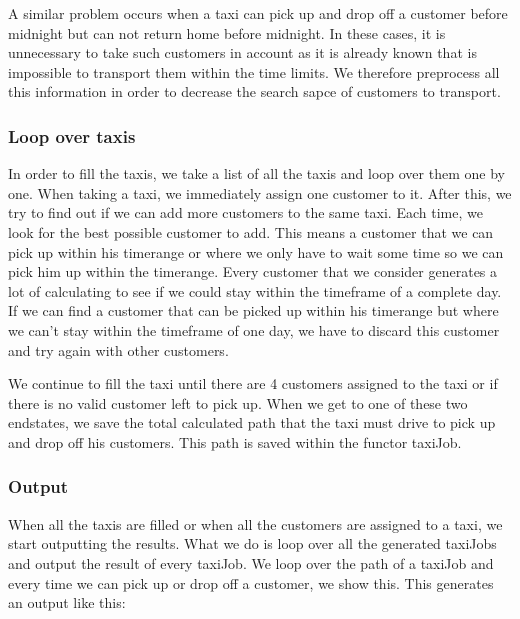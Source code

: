\documentclass[10pt,a4paper]{article}
\begin{document}
A similar problem occurs when a taxi can pick up and drop off a customer before midnight but can not return home before midnight. In these cases, it is unnecessary to take such customers in account as it is already known that is impossible to transport them within the time limits. We therefore preprocess all this information in order to decrease the search sapce of customers to transport.

\subsubsection{Loop over taxis}

In order to fill the taxis, we take a list of all the taxis and loop over them one by one. When taking a taxi, we immediately assign one customer to it. After this, we try to find out if we can add more customers to the same taxi. Each time, we look for the best possible customer to add. This means a customer that we can pick up within his timerange or where we only have to wait some time so we can pick him up within the timerange. Every customer that we consider generates a lot of calculating to see if we could stay within the timeframe of a complete day. If we can find a customer that can be picked up within his timerange but where we can't stay within the timeframe of one day, we have to discard this customer and try again with other customers.

We continue to fill the taxi until there are 4 customers assigned to the taxi or if there is no valid customer left to pick up. When we get to one of these two endstates, we save the total calculated path that the taxi must drive to pick up and drop off his customers. This path is saved within the functor taxiJob.

\subsubsection{Output}

When all the taxis are filled or when all the customers are assigned to a taxi, we start outputting the results. What we do is loop over all the generated taxiJobs and output the result of every taxiJob. We loop over the path of a taxiJob and every time we can pick up or drop off a customer, we show this. This generates an output like this:

\begin{quote}
\end{quote}
\end{document}
